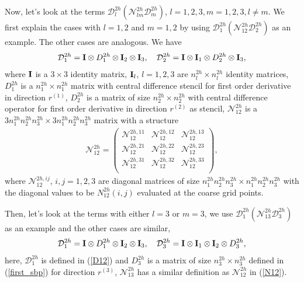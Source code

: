 Now, let's look at the terms $\mathcal{D}_l^{2h}(\mathcal{N}_{lm}^{2h}\mathcal{D}_m^{2h})$, $l = 1,2,3, m = 1,2,3, l\neq m$. We first explain the cases with $l = 1,2$ and $m = 1,2$ by using $\mathcal{D}_1^{2h}(\mathcal{N}_{12}^{2h}\mathcal{D}_2^{2h})$ as an example. The other cases are analogous. We have 
\begin{equation}\label{D12}
\mathcal{D}_1^{2h} = {\bf I}\otimes D_1^{2h} \otimes {\bf I}_2 \otimes {\bf I}_3,\ \ \ \mathcal{D}_2^{2h} ={\bf I}\otimes {\bf I}_1\otimes D_2^{2h}\otimes {\bf I}_3,
\end{equation}
where ${\bf I}$ is a $3\times3$ identity matrix, ${\bf I}_l$, $l = 1,2,3$ are $n_l^{2h}\times n_l^{2h}$ identity matrices, $D_1^{2h}$ is a $n_1^{2h}\times n_1^{2h}$ matrix with central difference stencil for first order derivative in direction $r^{(1)}$, $D_2^{2h}$ is a matrix of size $n_2^{2h}\times n_2^{2h}$ with central difference operator for first order derivative in direction $r^{(2)}$ as stencil, $\mathcal{N}_{12}^{2h}$ is a $3n_1^{2h}n_2^{2h}n_3^{2h}\times3n_1^{2h}n_2^{2h}n_3^{2h}$ matrix with a structure
\begin{align}\label{N12}
\mathcal{N}_{12}^{2h}= \left(\begin{array}{ccc}
\mathscr{N}_{12}^{2h,11}&\mathscr{N}_{12}^{2h,12}& \mathscr{N}_{12}^{2h,13}\\
\mathscr{N}_{12}^{2h,21} & \mathscr{N}_{12}^{2h,22} & \mathscr{N}_{12}^{2h,23} \\
\mathscr{N}_{12}^{2h,31}&\mathscr{N}_{12}^{2h,32}&  \mathscr{N}_{12}^{2h,33}\\ \end{array}\right),
\end{align}
where $\mathscr{N}_{12}^{2h,ij}$, $i,j = 1,2,3$ are diagonal matrices of size $n_1^{2h}n_2^{2h}n_3^{2h}\times n_1^{2h}n_2^{2h}n_3^{2h}$ with the diagonal values to be $N_{12}^{2h}(i,j)$ evaluated at the coarse grid points. 


Then, let's look at the terms with either $l = 3$ or $m = 3$, we use $\mathcal{D}_1^{2h}(\mathcal{N}_{13}^{2h}\mathcal{D}_3^{2h})$ as an example and the other cases are similar,
\begin{equation}\label{D13}
\mathcal{D}_1^{2h} = {\bf I}\otimes D_1^{2h} \otimes {\bf I}_2 \otimes {\bf I}_3,\ \ \ \mathcal{D}_3^{2h} ={\bf I}\otimes {\bf I}_1\otimes {\bf I}_2\otimes D_3^{2h},
\end{equation}
here, $\mathcal{D}_1^{2h}$ is defined in (\ref{D12}) and $D_3^{2h}$ is a matrix of size $n_3^{2h}\times n_3^{2h}$ defined in (\ref{first_sbp}) for direction $r^{(3)}$, $\mathcal{N}_{13}^{2h}$ has a similar definition as $\mathcal{N}_{12}^{2h}$ in (\ref{N12}).

